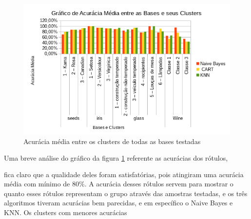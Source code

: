 \begin{figure}[h!]
        \centering
        \includegraphics[scale=0.9]{figs/grafico_acuracia_media_algoritmos.png}
        \caption{Acurácia média entre os clusters de todas as bases testadas} \label{fig:acuracia_media_algoritmos}
\end{figure}

Uma breve análise do gráfico da figura \ref{fig:acuracia_media_algoritmos} referente as acurácias dos rótulos, 

fica claro que a qualidade deles foram satisfatórias, pois atingiram uma acurácia média com mínimo de 80\%. A acurácia desses rótulos servem para mostrar o quanto esses rótulos representam o grupo através das amostras testadas, e os três algoritmos tiveram acurácias bem parecidas, e em específico o Naive Bayes e KNN. Os clusters com menores acurácias 

